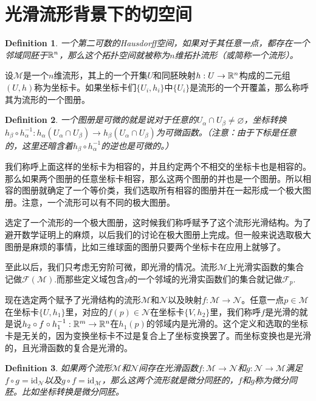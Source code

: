 \documentclass[8pt]{book}
\theoremstyle{plain}%
\newtheorem{defi}{Definition}[section]%
\begin{document}
\section{光滑流形背景下的切空间}
\begin{defi}
一个第二可数的Hausdorff空间，如果对于其任意一点，都存在一个邻域同胚于$\mathbb{R}^n$，那么这个拓扑空间就被称为$n$维拓扑流形（或简称一个流形）。
\end{defi}
设$\mathcal{M}$是一个$n$维流形，其上的一个开集$U$和同胚映射$h:U\to \mathbb{R}^n$构成的二元组$(U,h)$称为坐标卡。如果坐标卡们$\{U_i,h_i\}$中$\{U_i\}$是流形的一个开覆盖，那么称呼其为流形的一个图册。
\begin{defi}
一个图册是可微的就是说对于任意的$U_\alpha \cap U_{\beta}\neq \varnothing$，坐标转换$h_\beta\circ h_\alpha^{-1}: h_\alpha(U_\alpha\cap U_\beta) \to h_\beta(U_\alpha\cap U_\beta)$为可微函数。（注意：由于下标是任意的，这里还暗含着$h_\beta\circ h_\alpha^{-1}$的逆也是可微的。）
\end{defi}

我们称呼上面这样的坐标卡为相容的，并且约定两个不相交的坐标卡也是相容的。那么如果两个图册的任意坐标卡相容，那么这两个图册的并也是一个图册。所以相容的图册就确定了一个等价类，我们选取所有相容的图册并在一起形成一个极大图册。注意，一个流形可以有不同的极大图册。

选定了一个流形的一个极大图册，这时候我们称呼赋予了这个流形光滑结构。为了避开数学证明上的麻烦，以后我们的讨论在极大图册上完成。但一般来说选取极大图册是麻烦的事情，比如三维球面的图册只要两个坐标卡在应用上就够了。

至此以后，我们只考虑无穷阶可微，即光滑的情况。流形$\mathcal{M}$上光滑实函数的集合记做$\mathcal{F}(\mathcal{M})$.而那些定义域包含$p$的一个邻域的光滑实函数们的集合就记做$\mathcal{F}_p$.

现在选定两个赋予了光滑结构的流形$\mathcal{M}$和$\mathcal{N}$以及映射$f:\mathcal{M}\to \mathcal{N}$。任意一点$p\in \mathcal{M}$在坐标卡$\{U,h_1\}$里，对应的$f(p)\in \mathcal{N}$在坐标卡$\{V,h_2\}$里，我们称呼$f$是光滑的就是说$h_2 \circ f\circ h_1^{-1}:\mathbb{R}^m\to \mathbb{R}^n$在$h_1(p)$的邻域内是光滑的。这个定义和选取的坐标卡是无关的，因为变换坐标卡不过是复合上了坐标变换罢了。而坐标变换也是光滑的，且光滑函数的复合是光滑的。
\begin{defi}
如果两个流形$\mathcal{M}$和$\mathcal{N}$间存在光滑函数$f:\mathcal{M}\to \mathcal{N}$和$g:\mathcal{N}\to \mathcal{M}$满足$f\circ g =\mathrm{id}_\mathcal{N}$以及$g\circ f =\mathrm{id}_\mathcal{M}$，那么这两个流形就是微分同胚的，$f$和$g$称为微分同胚。比如坐标转换是微分同胚。
\end{defi}
\end{document}
